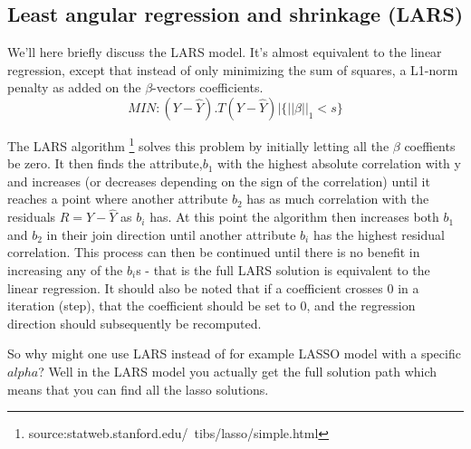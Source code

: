 \subsection{Least angular regression and shrinkage (LARS)}
We'll here briefly discuss the LARS model.
It's almost equivalent to the linear regression, except that instead of only minimizing the sum of squares, a L1-norm penalty as added on the $\beta$-vectors coefficients.
\begin{equation}
MIN: (Y-\hat{Y}).T (Y-\hat{Y}) | \{||\beta||_1<s\}
\end{equation}

The LARS algorithm \footnote{source:statweb.stanford.edu/~tibs/lasso/simple.html} solves this problem by initially letting all the $\beta$ coeffients be zero.
It then finds the attribute,$b_1$ with the highest absolute correlation with y and increases (or decreases depending on the sign of the correlation)
until it reaches a point where another attribute $b_2$ has as much  correlation with the residuals $R=Y-\hat{Y}$ as  $b_i$ has.
At this point the algorithm then increases both $b_1$ and $b_2$ in their join direction until another attribute $b_i$ has the highest residual correlation.
This process can then be continued until there is no benefit in increasing any of the $b_i$s - that is the full LARS solution is equivalent to the linear regression.
It should also be noted that if a coefficient crosses 0 in a iteration (step),
that the coefficient should be set to 0, and the regression direction should subsequently be recomputed.

So why might one use LARS instead of for example LASSO model with a specific $alpha$?
Well in the LARS model you actually get the full solution path which means that you can find all the lasso solutions.
